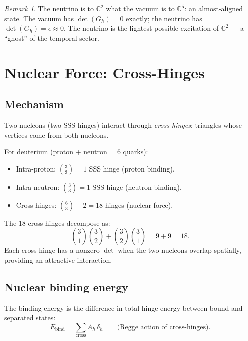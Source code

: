 \documentclass[12pt]{article}
\theoremstyle{remark}
\newtheorem{remark}[theorem]{Remark}
\begin{document}
\begin{remark}
The neutrino is to $\mathbb{C}^2$ what the vacuum is to $\mathbb{C}^5$: an almost-aligned state. The vacuum has $\det(G_h) = 0$ exactly; the neutrino has $\det(G_h) = \epsilon \approx 0$. The neutrino is the lightest possible excitation of $\mathbb{C}^2$ --- a ``ghost'' of the temporal sector.
\end{remark}

\section{Nuclear Force: Cross-Hinges}

\subsection{Mechanism}

Two nucleons (two SSS hinges) interact through \emph{cross-hinges}: triangles whose vertices come from both nucleons.

For deuterium (proton + neutron = 6 quarks):
\begin{itemize}
\item Intra-proton: $\binom{3}{3} = 1$ SSS hinge (proton binding).
\item Intra-neutron: $\binom{3}{3} = 1$ SSS hinge (neutron binding).
\item Cross-hinges: $\binom{6}{3} - 2 = 18$ hinges (nuclear force).
\end{itemize}

The 18 cross-hinges decompose as:
\begin{equation}
\binom{3}{1}\binom{3}{2} + \binom{3}{2}\binom{3}{1} = 9 + 9 = 18.
\end{equation}
Each cross-hinge has a nonzero $\det$ when the two nucleons overlap spatially, providing an attractive interaction.

\subsection{Nuclear binding energy}

The binding energy is the difference in total hinge energy between bound and separated states:
\begin{equation}
E_\text{bind} = \sum_{\text{cross}} A_h\,\delta_h \qquad \text{(Regge action of cross-hinges)}.
\end{equation}
\end{document}

